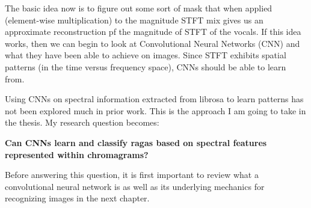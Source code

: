 The basic idea now is to figure out some sort of mask that when applied (element-wise multiplication) to the magnitude STFT mix gives us an approximate reconstruction pf the magnitude of STFT of the vocals. If this idea works, then we can begin to look at Convolutional Neural Networks (CNN) and what they have been able to achieve on images. Since STFT exhibits spatial patterns (in the time versus frequency space), CNNs should be able to learn from.

\par

Using CNNs on spectral information extracted from librosa to learn patterns has not been explored much in prior work. This is the approach I am going to take in the thesis. My research question becomes:  \par

\textbf{Can CNNs learn and classify ragas based on spectral features represented within chromagrams?}

Before answering this question, it is first important to review what a convolutional neural network is as well as its underlying mechanics for recognizing images in the next chapter.

     
